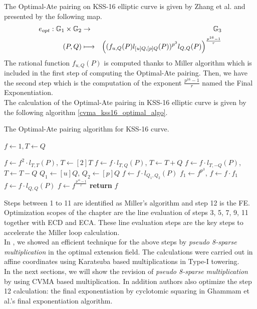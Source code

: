 The Optimal-Ate pairing on KSS-16 elliptic curve is given by Zhang et al. \cite{INDOCRYPT:ZhaLin12} and presented by the following map.
\begin{eqnarray*}
  e_{opt}: {\mathbb{G}}_{1}\times {\mathbb{G}}_{2} &\rightarrow & {\mathbb{G}}_{3} \\
  (P,Q) &\longmapsto &\left(( f_{u,Q}(P)l_{[u]Q,[p]Q}(P))^{p^3}l_{Q,Q}(P)\right)^{\frac{p^{16}-1}{r}}
\end{eqnarray*}
The rational function $f_{u,Q}(P)$ is computed thanks to Miller algorithm which is included in the first step of computing the Optimal-Ate pairing. Then, we have the second step which is the computation of the exponent $\frac{p^{16}-1}{r}$ named the Final Exponentiation.\\
The calculation of the Optimal-Ate pairing in KSS-16 elliptic curve is given by the following algorithm \ref{cvma_kss16_optimal_algo}.
\begin{algorithm}[ht]
	\caption{The Optimal-Ate pairing algorithm for KSS-16 curve.}
	\label{cvma_kss16_optimal_algo}
	\DontPrintSemicolon
%	
%	
	 $f \leftarrow 1,T \leftarrow Q$
	
	  {
		 $f\leftarrow f^2\cdot l_{T,T}(P)$, $T\leftarrow [2]T$ 
		  {
			 $f\leftarrow f\cdot l_{T,Q}(P)$, $T\leftarrow T+Q$ }
		  {
			 $f\leftarrow f\cdot l_{T,-Q}(P)$, $T\leftarrow T-Q$} } 
	 $Q_1\leftarrow [u]Q$, $Q_2\leftarrow [p]Q$ \;
	 $f\leftarrow f\cdot l_{Q_1,Q_2}(P)$ \;
	 $f_1\leftarrow f^{p^3}$, $f\leftarrow f\cdot f_1$ \;
	 $f\leftarrow f\cdot l_{Q,Q}(P)$ \;
	 $f\leftarrow f^{\frac{p^{16}-1}{r}}$\;
	 {\bf return} $f$\;
\end{algorithm}

Steps between  1 to 11 are identified as Miller's algorithm and step 12 is the FE.
Optimization scopes of the chapter are the line evaluation of steps 3, 5, 7, 9, 11 together with ECD and ECA.
These line evaluation steps are the key steps to accelerate the Miller loop calculation. \\
In \cite{INDOCRYPT:KNGDNK17}, we showed an efficient technique for the above steps by \textit{pseudo 8-sparse multiplication} in the optimal extension field. 
The calculations were carried out in affine coordinates using Karatsuba based multiplications in Type-I towering. \\
In the next sections, we will show the revision of \textit{pseudo 8-sparse multiplication} by using CVMA based multiplication.
In addition authors also optimize the step 12 calculation: the final exponentiation  by cyclotomic squaring \cite{PKC:GraSco10} in Ghammam et al.'s \cite{EPRINT:GhaFou16b} final exponentiation algorithm.

